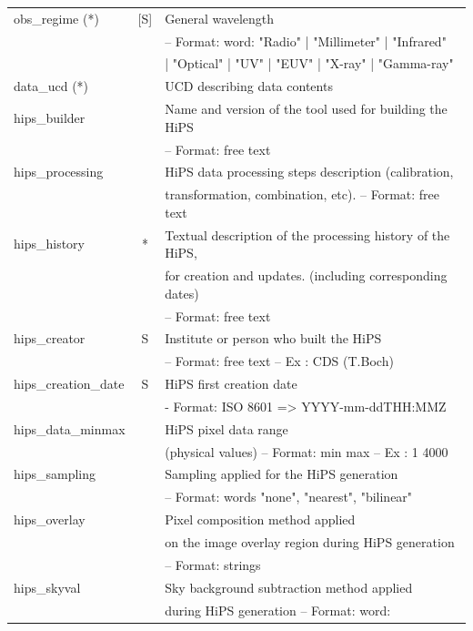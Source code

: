 \documentclass[11pt,a4paper]{ivoa}
\begin{document}
\begin{longtable}{|l|c|l|}
obs\_regime (*) & [S] & General wavelength\\ & & – Format: word: "Radio" | "Millimeter" | "Infrared"\\
 & & | "Optical" | "UV" | "EUV" | "X-ray" | "Gamma-ray" \\ \hline
data\_ucd (*) &   & UCD describing data contents \\ \hline
hips\_builder &   & Name and version of the tool used for building the HiPS\\ & & – Format: free text \\ \hline
hips\_processing &   & HiPS data processing steps description (calibration, \\ & & transformation, combination, etc). – Format: free text \\ \hline
hips\_history & * & Textual description of the processing history of the HiPS,\\ & &  for creation and updates. (including corresponding dates)\\ & &  – Format: free text \\ \hline
hips\_creator &  S  & Institute or person who built the HiPS\\ & & – Format: free text – Ex : CDS (T.Boch) \\ \hline
hips\_creation\_date & S & HiPS first creation date\\ & & - Format: ISO 8601 => YYYY-mm-ddTHH:MMZ \\ \hline
hips\_data\_minmax &   & HiPS pixel data range\\ & & (physical values) – Format: min max – Ex : 1 4000 \\ \hline
hips\_sampling &   & Sampling applied for the HiPS generation\\ & & – Format: words "none", "nearest", "bilinear" \\ \hline
hips\_overlay &   & Pixel composition method applied\\ & & on the image overlay region during HiPS generation\\
 & & – Format: strings \\ \hline
hips\_skyval &   & Sky background subtraction method applied\\ & &  during HiPS generation – Format: word: \\

\end{longtable}
\end{document}
